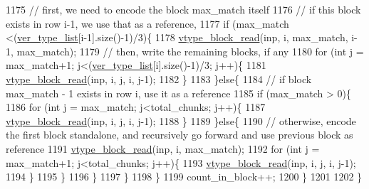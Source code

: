 \begin{DoxyCode}
1175         \textcolor{comment}{// first, we need to encode the block max\_match itself}
1176         \textcolor{comment}{// if this block exists in row i-1, we use that as a reference,}
1177         \textcolor{keywordflow}{if} (max\_match <(\hyperlink{classmarked__graph__compressed_af2e3e55223d436628a02758dfae88493}{ver\_type\_list}[i-1].size()-1)/3)\{
1178           \hyperlink{classmarked__graph__compressed_a4bf8563a2dfd3038dc5833c014320487}{vtype\_block\_read}(inp, i, max\_match, i-1, max\_match);
1179           \textcolor{comment}{// then, write the remaining blocks, if any}
1180           \textcolor{keywordflow}{for} (\textcolor{keywordtype}{int} j = max\_match+1; j<(\hyperlink{classmarked__graph__compressed_af2e3e55223d436628a02758dfae88493}{ver\_type\_list}[i].size()-1)/3; j++)\{
1181             \hyperlink{classmarked__graph__compressed_a4bf8563a2dfd3038dc5833c014320487}{vtype\_block\_read}(inp, i, j, i, j-1);
1182           \}
1183         \}\textcolor{keywordflow}{else}\{
1184           \textcolor{comment}{// if block max\_match - 1 exists in row i, use it as a reference}
1185           \textcolor{keywordflow}{if} (max\_match > 0)\{
1186             \textcolor{keywordflow}{for} (\textcolor{keywordtype}{int} j = max\_match; j<total\_chunks; j++)\{
1187               \hyperlink{classmarked__graph__compressed_a4bf8563a2dfd3038dc5833c014320487}{vtype\_block\_read}(inp, i, j, i, j-1);
1188             \}
1189           \}\textcolor{keywordflow}{else}\{
1190             \textcolor{comment}{// otherwise, encode the first block standalone, and recursively go forward and use previous
       block as reference }
1191             \hyperlink{classmarked__graph__compressed_a4bf8563a2dfd3038dc5833c014320487}{vtype\_block\_read}(inp, i, max\_match);
1192             \textcolor{keywordflow}{for} (\textcolor{keywordtype}{int} j = max\_match+1; j<total\_chunks; j++)\{
1193               \hyperlink{classmarked__graph__compressed_a4bf8563a2dfd3038dc5833c014320487}{vtype\_block\_read}(inp, i, j, i, j-1);
1194             \}
1195           \}
1196         \}
1197       \}
1198     \}
1199     count\_in\_block++;
1200   \}
1201 
1202 \}
\end{DoxyCode}
\mbox{\label{classmarked__graph__compressed_a889749dd51bc37917a156e337eac142a}} 
